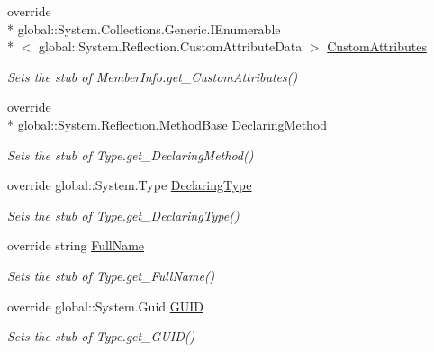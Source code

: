 \begin{DoxyCompactItemize}
override \\*
global\-::\-System.\-Collections.\-Generic.\-I\-Enumerable\\*
$<$ global\-::\-System.\-Reflection.\-Custom\-Attribute\-Data $>$ \hyperlink{class_system_1_1_fakes_1_1_stub_type_a6d43df5fd9436e2775406b1de6d0ae85}{Custom\-Attributes}
\begin{DoxyCompactList}\small\item\em Sets the stub of Member\-Info.\-get\-\_\-\-Custom\-Attributes()\end{DoxyCompactList}\item 
override \\*
global\-::\-System.\-Reflection.\-Method\-Base \hyperlink{class_system_1_1_fakes_1_1_stub_type_a44afe3835f68393983565d5a072ff32a}{Declaring\-Method}
\begin{DoxyCompactList}\small\item\em Sets the stub of Type.\-get\-\_\-\-Declaring\-Method()\end{DoxyCompactList}\item 
override global\-::\-System.\-Type \hyperlink{class_system_1_1_fakes_1_1_stub_type_af8cd38b597af64afef9e43ea4c78e613}{Declaring\-Type}
\begin{DoxyCompactList}\small\item\em Sets the stub of Type.\-get\-\_\-\-Declaring\-Type()\end{DoxyCompactList}\item 
override string \hyperlink{class_system_1_1_fakes_1_1_stub_type_a4f377cf12a88cf9a8fb230f3e43cf954}{Full\-Name}
\begin{DoxyCompactList}\small\item\em Sets the stub of Type.\-get\-\_\-\-Full\-Name()\end{DoxyCompactList}\item 
override global\-::\-System.\-Guid \hyperlink{class_system_1_1_fakes_1_1_stub_type_ae304932f93a4d8b6dc741aa38a7a178a}{G\-U\-I\-D}
\begin{DoxyCompactList}\small\item\em Sets the stub of Type.\-get\-\_\-\-G\-U\-I\-D()\end{DoxyCompactList}\item 

\end{DoxyCompactItemize}

